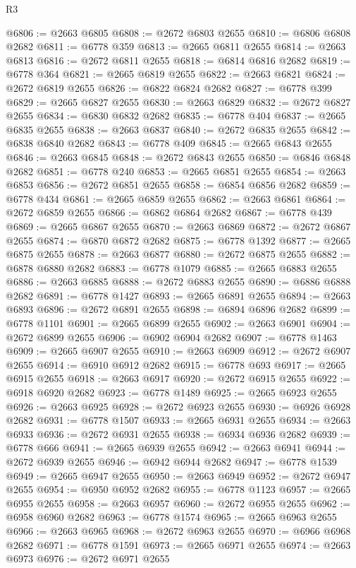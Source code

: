 \begin{lexlean}{R3}
\begin{coremodule}
@6806 := @2663 @6805
@6808 := @2672 @6803 @2655
@6810 := @6806 @6808 @2682
@6811 := @6778 @359
@6813 := @2665 @6811 @2655
@6814 := @2663 @6813
@6816 := @2672 @6811 @2655
@6818 := @6814 @6816 @2682
@6819 := @6778 @364
@6821 := @2665 @6819 @2655
@6822 := @2663 @6821
@6824 := @2672 @6819 @2655
@6826 := @6822 @6824 @2682
@6827 := @6778 @399
@6829 := @2665 @6827 @2655
@6830 := @2663 @6829
@6832 := @2672 @6827 @2655
@6834 := @6830 @6832 @2682
@6835 := @6778 @404
@6837 := @2665 @6835 @2655
@6838 := @2663 @6837
@6840 := @2672 @6835 @2655
@6842 := @6838 @6840 @2682
@6843 := @6778 @409
@6845 := @2665 @6843 @2655
@6846 := @2663 @6845
@6848 := @2672 @6843 @2655
@6850 := @6846 @6848 @2682
@6851 := @6778 @240
@6853 := @2665 @6851 @2655
@6854 := @2663 @6853
@6856 := @2672 @6851 @2655
@6858 := @6854 @6856 @2682
@6859 := @6778 @434
@6861 := @2665 @6859 @2655
@6862 := @2663 @6861
@6864 := @2672 @6859 @2655
@6866 := @6862 @6864 @2682
@6867 := @6778 @439
@6869 := @2665 @6867 @2655
@6870 := @2663 @6869
@6872 := @2672 @6867 @2655
@6874 := @6870 @6872 @2682
@6875 := @6778 @1392
@6877 := @2665 @6875 @2655
@6878 := @2663 @6877
@6880 := @2672 @6875 @2655
@6882 := @6878 @6880 @2682
@6883 := @6778 @1079
@6885 := @2665 @6883 @2655
@6886 := @2663 @6885
@6888 := @2672 @6883 @2655
@6890 := @6886 @6888 @2682
@6891 := @6778 @1427
@6893 := @2665 @6891 @2655
@6894 := @2663 @6893
@6896 := @2672 @6891 @2655
@6898 := @6894 @6896 @2682
@6899 := @6778 @1101
@6901 := @2665 @6899 @2655
@6902 := @2663 @6901
@6904 := @2672 @6899 @2655
@6906 := @6902 @6904 @2682
@6907 := @6778 @1463
@6909 := @2665 @6907 @2655
@6910 := @2663 @6909
@6912 := @2672 @6907 @2655
@6914 := @6910 @6912 @2682
@6915 := @6778 @693
@6917 := @2665 @6915 @2655
@6918 := @2663 @6917
@6920 := @2672 @6915 @2655
@6922 := @6918 @6920 @2682
@6923 := @6778 @1489
@6925 := @2665 @6923 @2655
@6926 := @2663 @6925
@6928 := @2672 @6923 @2655
@6930 := @6926 @6928 @2682
@6931 := @6778 @1507
@6933 := @2665 @6931 @2655
@6934 := @2663 @6933
@6936 := @2672 @6931 @2655
@6938 := @6934 @6936 @2682
@6939 := @6778 @666
@6941 := @2665 @6939 @2655
@6942 := @2663 @6941
@6944 := @2672 @6939 @2655
@6946 := @6942 @6944 @2682
@6947 := @6778 @1539
@6949 := @2665 @6947 @2655
@6950 := @2663 @6949
@6952 := @2672 @6947 @2655
@6954 := @6950 @6952 @2682
@6955 := @6778 @1123
@6957 := @2665 @6955 @2655
@6958 := @2663 @6957
@6960 := @2672 @6955 @2655
@6962 := @6958 @6960 @2682
@6963 := @6778 @1574
@6965 := @2665 @6963 @2655
@6966 := @2663 @6965
@6968 := @2672 @6963 @2655
@6970 := @6966 @6968 @2682
@6971 := @6778 @1591
@6973 := @2665 @6971 @2655
@6974 := @2663 @6973
@6976 := @2672 @6971 @2655

\end{coremodule}
\end{lexlean}

